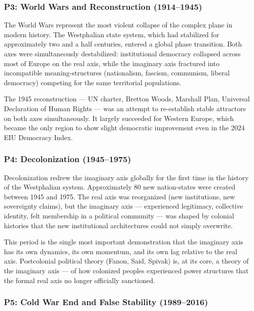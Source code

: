 \documentclass[11pt,letterpaper]{article}
\begin{document}
\subsubsection{P3: World Wars and Reconstruction (1914--1945)}

The World Wars represent the most violent collapse of the complex plane in modern history. The Westphalian state system, which had stabilized for approximately two and a half centuries, entered a global phase transition. Both axes were simultaneously destabilized: institutional democracy collapsed across most of Europe on the real axis, while the imaginary axis fractured into incompatible meaning-structures (nationalism, fascism, communism, liberal democracy) competing for the same territorial populations.

The 1945 reconstruction --- UN charter, Bretton Woods, Marshall Plan, Universal Declaration of Human Rights --- was an attempt to re-establish stable attractors on both axes simultaneously. It largely succeeded for Western Europe, which became the only region to show slight democratic improvement even in the 2024 EIU Democracy Index.

\subsubsection{P4: Decolonization (1945--1975)}

Decolonization redrew the imaginary axis globally for the first time in the history of the Westphalian system. Approximately 80 new nation-states were created between 1945 and 1975. The real axis was reorganized (new institutions, new sovereignty claims), but the imaginary axis --- experienced legitimacy, collective identity, felt membership in a political community --- was shaped by colonial histories that the new institutional architectures could not simply overwrite.

This period is the single most important demonstration that the imaginary axis has its own dynamics, its own momentum, and its own lag relative to the real axis. Postcolonial political theory (Fanon, Said, Spivak) is, at its core, a theory of the imaginary axis --- of how colonized peoples experienced power structures that the formal real axis no longer officially sanctioned.

\subsubsection{P5: Cold War End and False Stability (1989--2016)}
\end{document}
